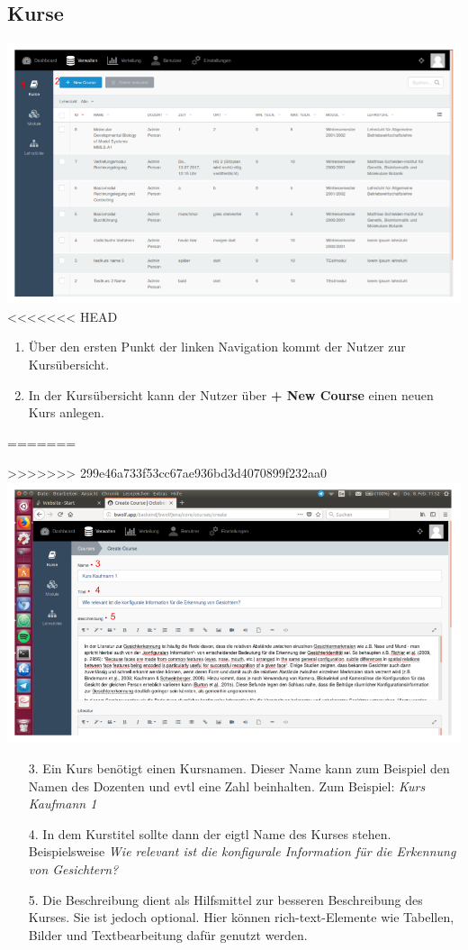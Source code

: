     \subsection{Kurse}
    
    \includegraphics[scale=0.3]{backend/img/verwalten_kurse.png}
<<<<<<< HEAD
    \begin{enumerate}
     \item Über den ersten Punkt der linken Navigation kommt der Nutzer zur Kursübersicht.
     \item In der Kursübersicht kann der Nutzer über \textbf{+ New Course} einen neuen Kurs anlegen. 
    \end{enumerate}
    
=======

>>>>>>> 299e46a733f53cc67ae936bd3d4070899f232aa0
    \includegraphics[scale=0.3]{backend/img/create_course_1.png}
    \begin{enumerate}
     \item[3.] Ein Kurs benötigt einen Kursnamen. Dieser Name kann zum Beispiel den Namen des Dozenten und evtl eine Zahl beinhalten. Zum Beispiel: \textit{Kurs Kaufmann 1}
     \item[4.] In dem Kurstitel sollte dann der eigtl Name des Kurses stehen. Beispielsweise \textit{Wie relevant ist die konfigurale Information für die Erkennung von Gesichtern?}
     \item[5.] Die Beschreibung dient als Hilfsmittel zur besseren Beschreibung des Kurses. Sie ist jedoch optional.
	       Hier können rich-text-Elemente wie Tabellen, Bilder und Textbearbeitung dafür genutzt werden.
    \end{enumerate}

